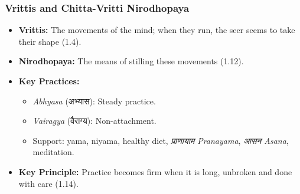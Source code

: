 
\begin{frame}[fragile]\frametitle{Vrittis and Chitta-Vritti Nirodhopaya} 
	\begin{itemize} 
	\item \textbf{Vrittis:} The movements of the mind; when they run, the seer seems to take their shape (1.4).
	\item \textbf{Nirodhopaya:} The means of stilling these movements (1.12).
	\item \textbf{Key Practices:}
		\begin{itemize}
			\item \textit{Abhyasa} (अभ्यास): Steady practice.
			\item \textit{Vairagya} (वैराग्य): Non-attachment.
			\item Support: yama, niyama, healthy diet, \textit{प्राणायाम Pranayama}, \textit{आसन Asana}, meditation.
		\end{itemize}
	\item \textbf{Key Principle:} Practice becomes firm when it is long, unbroken and done with care (1.14).
	\end{itemize} 
\end{frame}

